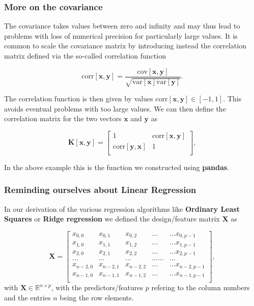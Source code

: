 \documentclass{beamer}
\begin{document}
\begin{frame}
\frametitle{More on the covariance}

The covariance takes values between zero and infinity and may thus
lead to problems with loss of numerical precision for particularly
large values. It is common to scale the covariance matrix by
introducing instead the correlation matrix defined via the so-called
correlation function

\[
\mathrm{corr}[\bm{x},\bm{y}]=\frac{\mathrm{cov}[\bm{x},\bm{y}]}{\sqrt{\mathrm{var}[\bm{x}] \mathrm{var}[\bm{y}]}}.
\]

The correlation function is then given by values $\mathrm{corr}[\bm{x},\bm{y}]
\in [-1,1]$. This avoids eventual problems with too large values. We
can then define the correlation matrix for the two vectors $\bm{x}$
and $\bm{y}$ as

\[
\bm{K}[\bm{x},\bm{y}] = \begin{bmatrix} 1 & \mathrm{corr}[\bm{x},\bm{y}] \\
                              \mathrm{corr}[\bm{y},\bm{x}] & 1 \\
             \end{bmatrix},
\]

In the above example this is the function we constructed using \textbf{pandas}.
\end{frame}

\begin{frame}
\frametitle{Reminding ourselves about Linear Regression}

In our derivation of the various regression algorithms like \textbf{Ordinary Least Squares} or \textbf{Ridge regression}
we defined the design/feature matrix $\bm{X}$ as

\[
\bm{X}=\begin{bmatrix}
x_{0,0} & x_{0,1} & x_{0,2}& \dots & \dots x_{0,p-1}\\
x_{1,0} & x_{1,1} & x_{1,2}& \dots & \dots x_{1,p-1}\\
x_{2,0} & x_{2,1} & x_{2,2}& \dots & \dots x_{2,p-1}\\
\dots & \dots & \dots & \dots \dots & \dots \\
x_{n-2,0} & x_{n-2,1} & x_{n-2,2}& \dots & \dots x_{n-2,p-1}\\
x_{n-1,0} & x_{n-1,1} & x_{n-1,2}& \dots & \dots x_{n-1,p-1}\\
\end{bmatrix},
\]
with $\bm{X}\in {\mathbb{R}}^{n\times p}$, with the predictors/features $p$  refering to the column numbers and the
entries $n$ being the row elements.
\end{frame}
\end{document}

